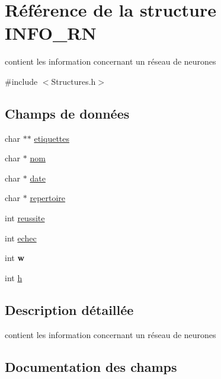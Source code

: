 \hypertarget{structINFO__RN}{}\section{Référence de la structure I\+N\+F\+O\+\_\+\+RN}
\label{structINFO__RN}


contient les information concernant un réseau de neurones  




{\ttfamily \#include $<$Structures.\+h$>$}

\subsection*{Champs de données}
\begin{DoxyCompactItemize}
\item 
char $\ast$$\ast$ \hyperlink{structINFO__RN_abc9704518ac93f743cfebf1baa32a80b}{etiquettes}
\item 
char $\ast$ \hyperlink{structINFO__RN_a703843a6712fdf0f2b04cd5b809c644c}{nom}
\item 
char $\ast$ \hyperlink{structINFO__RN_a35f15519beb59c036debb398bb118f46}{date}
\item 
char $\ast$ \hyperlink{structINFO__RN_a18461fa670221134de73e534b777628c}{repertoire}
\item 
int \hyperlink{structINFO__RN_a3cab3947c958e59dfe3cee9bc27c2e04}{reussite}
\item 
int \hyperlink{structINFO__RN_a7be6e5b6b85d6f54701cfcb4decf5f4e}{echec}
\item 
int {\bfseries w}\hypertarget{structINFO__RN_a5f950649165382855f5b659f61d75487}{}\label{structINFO__RN_a5f950649165382855f5b659f61d75487}

\item 
int \hyperlink{structINFO__RN_ac0d2599d6266859202d791a041f14ae3}{h}
\end{DoxyCompactItemize}


\subsection{Description détaillée}
contient les information concernant un réseau de neurones 

\subsection{Documentation des champs}
